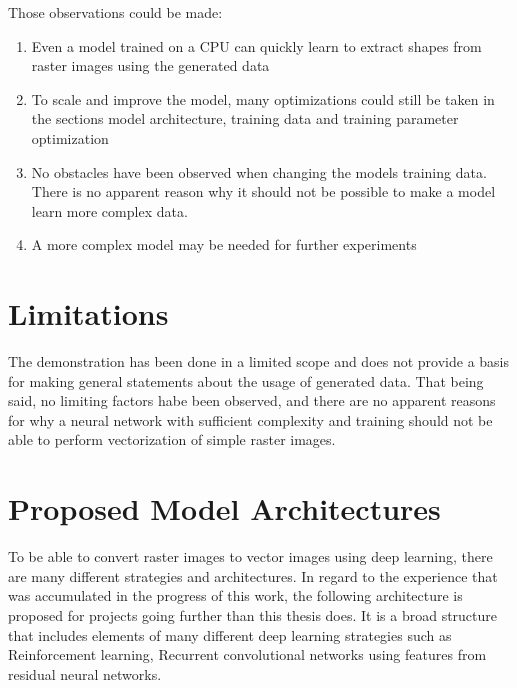 \documentclass[12pt, a4paper, titlepage]{report}
\begin{document}
Those observations could be made:

\begin{enumerate}[label=\Roman*]
   \item Even a model trained on a CPU can quickly learn to extract shapes from raster images using the generated data
   \item To scale and improve the model, many optimizations could still be taken in the sections model architecture, training data and training parameter optimization
   \item No obstacles have been observed when changing the models training data. There is no apparent reason why it should not be possible to make a model learn more complex data.
   \item A more complex model may be needed for further experiments
\end{enumerate}


\section{Limitations}

The demonstration has been done in a limited scope and does not provide a basis for making general statements about the usage of generated data. That being said, no limiting factors habe been observed, and there are no apparent reasons for why a neural network with sufficient complexity and training should not be able to perform vectorization of simple raster images.

\section{Proposed Model Architectures}

To be able to convert raster images to vector images using deep learning, there are many different strategies and architectures. In regard to the experience that was accumulated in the progress of this work, the following architecture is proposed for projects going further than this thesis does. It is a broad structure that includes elements of many different deep learning strategies such as Reinforcement learning, Recurrent convolutional networks using features from residual neural networks.
\end{document}
